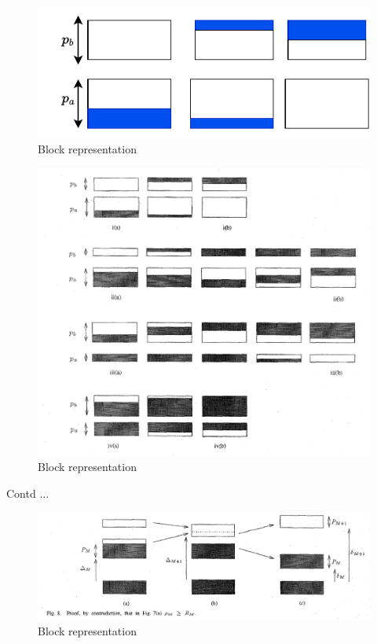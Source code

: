\documentclass[10pt]{beamer}
\begin{document}
\begin{frame}[t]
\begin{figure}[htb!]
	\centering
	\includegraphics[height=.3\textheight]{pic_8.pdf}
	\caption{Block representation}
	\label{fig7}
\end{figure}
\end{frame}
\begin{frame}[t]
	\begin{figure}[htb!]
		\centering
		\includegraphics[height=.7\textheight]{fig_9.png}
		\caption{Block representation}
		\label{fig8}
	\end{figure}
\end{frame}
\begin{frame}[t]{Contd $\dots$}
	\begin{figure}[htb!]
		\centering
		\includegraphics[height=.4\textheight]{fig_10.png}
		\caption{Block representation}
		\label{fig9}
	\end{figure}
\end{frame}
\end{document}
